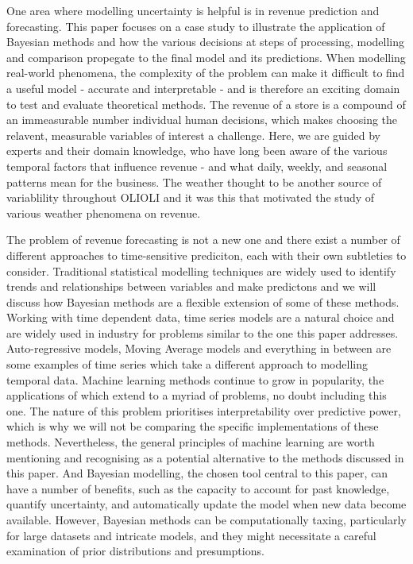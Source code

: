 One area where modelling uncertainty is helpful is in revenue prediction and forecasting. 
This paper focuses on a case study to illustrate the application of Bayesian methods
and how the various decisions at steps of processing, modelling and comparison propegate 
to the final model and its predictions.
When modelling real-world phenomena, the complexity of the problem can make it difficult 
to find a useful model - accurate and interpretable - and is therefore an exciting domain 
to test and evaluate theoretical methods.
The revenue of a store is a compound of an immeasurable number individual human
decisions, which makes choosing the relavent, measurable variables of interest
a challenge. 
Here, we are guided by experts and their domain knowledge, who
have long been aware of the various temporal factors that influence revenue -
and what daily, weekly, and seasonal patterns mean for the business. The
weather thought to be another source of variablility throughout OLIOLI and it
was this that motivated the study of various weather phenomena on revenue.


The problem of revenue forecasting is not a new one and there exist a number of
different approaches to time-sensitive prediciton, each with their own
subtleties to consider.
Traditional statistical modelling techniques are widely used to identify trends
and relationships between variables and make predictons and we will discuss how
Bayesian methods are a flexible extension of some of these methods. 
Working with time dependent data, time series models are a natural choice and
are widely used in industry for problems similar to the one this paper
addresses. Auto-regressive models, Moving Average models and everything in
between are some examples of time series which take a different approach to
modelling temporal data.
Machine learning methods continue to grow in popularity, the applications of
which extend to a myriad of problems, no doubt including this one. The nature
of this problem prioritises interpretability over predictive power, which is
why we will not be comparing the specific implementations of these methods.
Nevertheless, the general principles of machine learning are worth mentioning
and recognising as a potential alternative to the methods discussed in this
paper.
And Bayesian modelling, the chosen tool central to this paper, can have a
number of benefits, such as the capacity to account for past knowledge,
quantify uncertainty, and automatically update the model when new data become
available. However, Bayesian methods can be computationally taxing,
particularly for large datasets and intricate models, and they might
necessitate a careful examination of prior distributions and presumptions.

